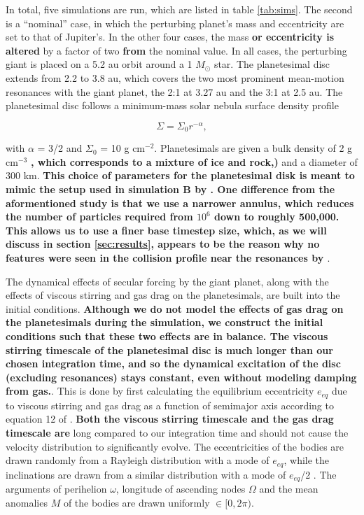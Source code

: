 \documentclass[fleqn,usenatbib]{mnras}
\begin{document}
In total, five simulations are run, which are listed in table
\ref{tab:sims}. The second
is a ``nominal'' case, in which the perturbing planet's mass and 
eccentricity are set to that of Jupiter's. In the other four cases, the mass \textbf{or eccentricity is altered} by a factor of two \textbf{from} the nominal value. In all cases, the perturbing giant is placed on a 5.2 au orbit around a 1 $M_{\odot}$ star. The 
planetesimal disc extends from 2.2 to 3.8 au, which covers the two most prominent mean-motion resonances with the giant planet, the 2:1 at 3.27 au 
and the 3:1 at 2.5 au. The planetesimal disc follows a minimum-mass solar nebula surface density profile \citep{1981PThPS..70...35H}

\begin{equation}\label{eq:surf_den}
	\Sigma = \Sigma_{0} r^{-\alpha},
\end{equation}

\noindent with $\alpha$ = 3/2 and $\Sigma_{0}$ = 10 g cm$^{-2}$. Planetesimals are given a bulk density of 2 g cm$^{-3}$ \textbf{, which corresponds to a mixture of ice and rock,)} and a diameter of 
300 km. \textbf{This choice of parameters for the planetesimal disk is meant to mimic the setup used in simulation B by \citet{2000Icar..143...45R}. One difference from the aformentioned study is that we use a narrower annulus, which reduces the number of particles required from $10^6$ down to roughly 500,000. This allows us to use a finer base timestep size, which, as we will discuss in section \ref{sec:results}, appears to be the reason why no features were seen in the collision profile near the resonances by \citet{2000Icar..143...45R}}.

The dynamical effects of secular forcing by the giant planet, along with  the effects of viscous stirring and gas drag on the planetesimals, are 
built into the initial conditions. \textbf{Although we do not model the effects of gas drag on the planetesimals during the simulation, we construct the initial conditions such that these two effects are in balance. The viscous stirring timescale of the planetesimal disc is much longer than our chosen integration time, and so the dynamical excitation of the disc (excluding resonances) stays constant, even without modeling damping from gas.}. This is done by first calculating the equilibrium eccentricity $e_{eq}$ due to viscous stirring and gas drag as a 
function of semimajor axis according to equation 12 of \citet{2002ApJ...581..666K}. \textbf{Both the viscous stirring timescale and the gas drag timescale are} long compared to our integration time and should not cause the velocity 
distribution to significantly evolve. The eccentricities of the bodies are drawn randomly from a Rayleigh distribution with a mode of $e_{eq}$, 
while the inclinations are drawn from a similar distribution with a mode of $e_{eq}$/2 \citep{1993MNRAS.263..875I}. The arguments of perihelion 
$\omega$, longitude of ascending nodes $\Omega$ and the mean anomalies $M$ of the bodies are drawn uniformly $\in [0, 2 \pi)$.
\end{document}
